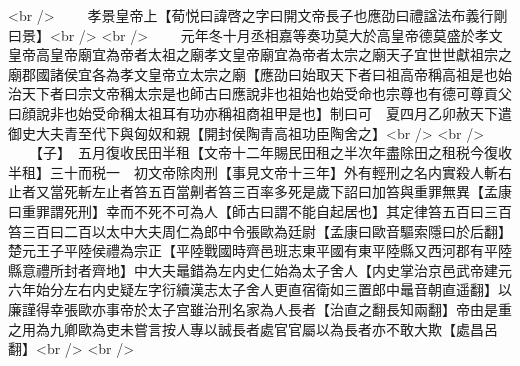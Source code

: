 <br />
　　孝景皇帝上【荀悦曰諱啓之字曰開文帝長子也應劭曰禮諡法布義行剛曰景】<br />
<br />
　　元年冬十月丞相嘉等奏功莫大於高皇帝德莫盛於孝文皇帝高皇帝廟宜為帝者太祖之廟孝文皇帝廟宜為帝者太宗之廟天子宜世世獻祖宗之廟郡國諸侯宜各為孝文皇帝立太宗之廟【應劭曰始取天下者曰祖高帝稱高祖是也始治天下者曰宗文帝稱太宗是也師古曰應說非也祖始也始受命也宗尊也有德可尊貢父曰顔說非也始受命稱太祖耳有功亦稱祖商祖甲是也】制曰可　夏四月乙卯赦天下遣御史大夫青至代下與匈奴和親【開封侯陶青高祖功臣陶舍之】<br />
<br />
　　【子】　五月復收民田半租【文帝十二年賜民田租之半次年盡除田之租税今復收半租】三十而税一　初文帝除肉刑【事見文帝十三年】外有輕刑之名内實殺人斬右止者又當死斬左止者笞五百當劓者笞三百率多死是歲下詔曰加笞與重罪無異【孟康曰重罪謂死刑】幸而不死不可為人【師古曰謂不能自起居也】其定律笞五百曰三百笞三百曰二百以太中大夫周仁為郎中令張歐為廷尉【孟康曰歐音驅索隱曰於后翻】楚元王子平陸侯禮為宗正【平陸戰國時齊邑班志東平國有東平陸縣又西河郡有平陸縣意禮所封者齊地】中大夫鼂錯為左内史仁始為太子舍人【内史掌治京邑武帝建元六年始分左右内史疑左字衍續漢志太子舍人更直宿衛如三置郎中鼂音朝直遥翻】以廉謹得幸張歐亦事帝於太子宫雖治刑名家為人長者【治直之翻長知兩翻】帝由是重之用為九卿歐為吏未嘗言按人專以誠長者處官官屬以為長者亦不敢大欺【處昌呂翻】<br />
<br />
